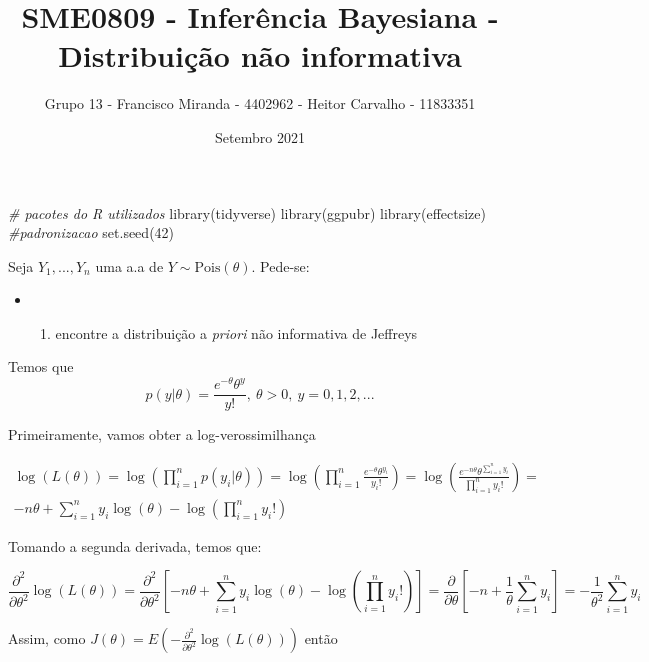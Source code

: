 \documentclass[
]{article}
\title{SME0809 - Inferência Bayesiana - Distribuição não informativa}
\author{Grupo 13 - Francisco Miranda - 4402962 - Heitor Carvalho -
11833351}
\date{Setembro 2021}
\newenvironment{Shaded}{\begin{snugshade}}{\end{snugshade}}
\newcommand{\CommentTok}[1]{\textcolor[rgb]{0.56,0.35,0.01}{\textit{#1}}}
\newcommand{\DecValTok}[1]{\textcolor[rgb]{0.00,0.00,0.81}{#1}}
\newcommand{\FunctionTok}[1]{\textcolor[rgb]{0.00,0.00,0.00}{#1}}
\newcommand{\NormalTok}[1]{#1}
\providecommand{\tightlist}{%
  \setlength{\itemsep}{0pt}\setlength{\parskip}{0pt}}
\begin{document}
\maketitle

\begin{Shaded}
\begin{Highlighting}[]
\CommentTok{\# pacotes do R utilizados}
\FunctionTok{library}\NormalTok{(tidyverse)}
\FunctionTok{library}\NormalTok{(ggpubr)}
\FunctionTok{library}\NormalTok{(effectsize) }\CommentTok{\#padronizacao}
\FunctionTok{set.seed}\NormalTok{(}\DecValTok{42}\NormalTok{)}
\end{Highlighting}
\end{Shaded}

Seja \(Y_1,..., Y_n\) uma a.a de \(Y \sim \text{Pois}(\theta)\).
Pede-se:

\begin{itemize}
\item
  \begin{enumerate}
  \def\labelenumi{\alph{enumi})}
  \tightlist
  \item
    encontre a distribuição a \emph{priori} não informativa de Jeffreys
  \end{enumerate}
\end{itemize}

Temos que
\[p(y|\theta) = \frac{e^{-\theta} \theta^y }{y!},\ \theta > 0, \ y = 0, 1, 2, ...\]

Primeiramente, vamos obter a log-verossimilhança

\[\begin{aligned} 
\log(L(\theta)) =
\log \left(\prod_{i=1}^n p(y_i|\theta) \right) =
\log \left( \prod_{i=1}^n  \frac{e^{-\theta} \theta^{y_i} }{y_i!} \right)=
\log \left( \frac{e^{-n \theta} \theta^{\sum_{i=1}^n y_i} }{\prod_{i=1}^n y_i!} \right) = \\
-n\theta + \sum_{i=1}^n y_i\log(\theta) - \log\left(\prod_{i=1}^n y_i!\right)
\end{aligned} \]

Tomando a segunda derivada, temos que:

\[\frac{\partial^2}{\partial \theta^2}\log(L(\theta)) = 
  \frac{\partial^2}{\partial \theta^2}\left[-n\theta + \sum_{i=1}^n y_i\log(\theta) - \log\left(\prod_{i=1}^n y_i!\right)\right] =
  \frac{\partial}{\partial \theta}\left[-n + \frac{1}{\theta}\sum_{i=1}^n y_i\right] =
  -\frac1{\theta^{2}} \sum_{i=1}^n y_i \]

Assim, como
\(J(\theta) = E\left(- \frac{\partial^2}{\partial \theta^2}\log(L(\theta))\right)\)
então
\end{document}
